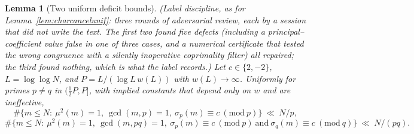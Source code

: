 \documentclass[11pt]{article}
\newtheorem{lemma}[theorem]{Lemma}
\theoremstyle{definition}
\begin{document}
\begin{lemma}[Two uniform deficit bounds]\label{lem:deficit}
\textup{(Label discipline, as for Lemma~\ref{lem:charcancelunif}: three rounds of adversarial review,
each by a session that did not write the text. The first two found five defects (including a
principal--coefficient value false in one of three cases, and a numerical certificate that tested the
wrong congruence with a silently inoperative coprimality filter) all repaired; the third found
nothing, which is what the label records.)}
Let $c\in\{2,-2\}$, $L=\log\log N$, and $P=L/(\log L\,w(L))$ with $w(L)\to\infty$. Uniformly
for primes $p\ne q$ in $(\tfrac12P,P]$, with implied constants that depend only on $w$ and are
ineffective,
\[ \#\{m\le N:\ \mu^2(m)=1,\ \gcd(m,p)=1,\ \sigma_p(m)\equiv c\ (\mathrm{mod}\ p)\}\ \ll\ N/p, \]
\[ \#\{m\le N:\ \mu^2(m)=1,\ \gcd(m,pq)=1,\ \sigma_p(m)\equiv c\ (\mathrm{mod}\ p)\ \text{and}\
   \sigma_q(m)\equiv c\ (\mathrm{mod}\ q)\}\ \ll\ N/(pq). \]
\end{lemma}
\end{document}
